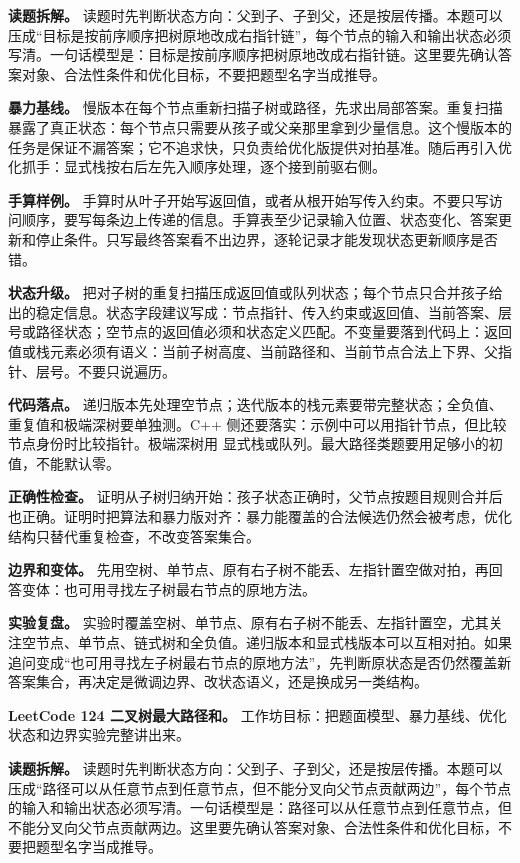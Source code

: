 \textbf{读题拆解。} 读题时先判断状态方向：父到子、子到父，还是按层传播。本题可以压成“目标是按前序顺序把树原地改成右指针链”，每个节点的输入和输出状态必须写清。一句话模型是：目标是按前序顺序把树原地改成右指针链。这里要先确认答案对象、合法性条件和优化目标，不要把题型名字当成推导。

\textbf{暴力基线。} 慢版本在每个节点重新扫描子树或路径，先求出局部答案。重复扫描暴露了真正状态：每个节点只需要从孩子或父亲那里拿到少量信息。这个慢版本的任务是保证不漏答案；它不追求快，只负责给优化版提供对拍基准。随后再引入优化抓手：显式栈按右后左先入顺序处理，逐个接到前驱右侧。

\textbf{手算样例。} 手算时从叶子开始写返回值，或者从根开始写传入约束。不要只写访问顺序，要写每条边上传递的信息。手算表至少记录输入位置、状态变化、答案更新和停止条件。只写最终答案看不出边界，逐轮记录才能发现状态更新顺序是否错。

\textbf{状态升级。} 把对子树的重复扫描压成返回值或队列状态；每个节点只合并孩子给出的稳定信息。状态字段建议写成：节点指针、传入约束或返回值、当前答案、层号或路径状态；空节点的返回值必须和状态定义匹配。不变量要落到代码上：返回值或栈元素必须有语义：当前子树高度、当前路径和、当前节点合法上下界、父指针、层号。不要只说遍历。

\textbf{代码落点。} 递归版本先处理空节点；迭代版本的栈元素要带完整状态；全负值、重复值和极端深树要单独测。C++ 侧还要落实：示例中可以用指针节点，但比较节点身份时比较指针。极端深树用  显式栈或队列。最大路径类题要用足够小的初值，不能默认零。

\textbf{正确性检查。} 证明从子树归纳开始：孩子状态正确时，父节点按题目规则合并后也正确。证明时把算法和暴力版对齐：暴力能覆盖的合法候选仍然会被考虑，优化结构只替代重复检查，不改变答案集合。

\textbf{边界和变体。} 先用空树、单节点、原有右子树不能丢、左指针置空做对拍，再回答变体：也可用寻找左子树最右节点的原地方法。

\textbf{实验复盘。} 实验时覆盖空树、单节点、原有右子树不能丢、左指针置空，尤其关注空节点、单节点、链式树和全负值。递归版本和显式栈版本可以互相对拍。如果追问变成“也可用寻找左子树最右节点的原地方法”，先判断原状态是否仍然覆盖新答案集合，再决定是微调边界、改状态语义，还是换成另一类结构。

\noindent\textbf{LeetCode 124 二叉树最大路径和。} 工作坊目标：把题面模型、暴力基线、优化状态和边界实验完整讲出来。

\textbf{读题拆解。} 读题时先判断状态方向：父到子、子到父，还是按层传播。本题可以压成“路径可以从任意节点到任意节点，但不能分叉向父节点贡献两边”，每个节点的输入和输出状态必须写清。一句话模型是：路径可以从任意节点到任意节点，但不能分叉向父节点贡献两边。这里要先确认答案对象、合法性条件和优化目标，不要把题型名字当成推导。

